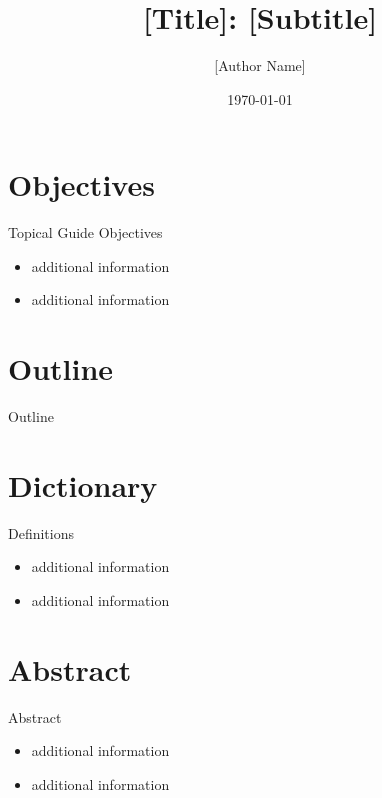 \documentclass{beamer}
\title{[Title]: [Subtitle]}
\author{[Author Name]}
\date{\today}
\begin{document}
\frame{\titlepage}


\section{Objectives}
\begin{frame}{Topical Guide Objectives}
  \begin{itemize}
    \item<1-> additional information
    \item<2-> additional information
  \end{itemize}
\end{frame}


\section{Outline}
\begin{frame}{Outline}
  \tableofcontents
\end{frame}


\section{Dictionary}
\begin{frame}{Definitions}
  \begin{itemize}
    \item<1-> additional information
    \item<2-> additional information
  \end{itemize}
\end{frame}


\section{Abstract}
\begin{frame}{Abstract}
  \begin{itemize}
    \item<1-> additional information
    \item<2-> additional information
  \end{itemize}
\end{frame}
\end{document}
